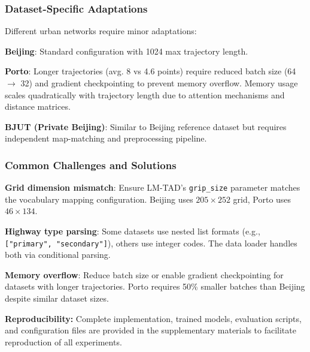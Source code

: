 \subsubsection{Dataset-Specific Adaptations}

Different urban networks require minor adaptations:

\textbf{Beijing}: Standard configuration with 1024 max trajectory length.

\textbf{Porto}: Longer trajectories (avg. 8 vs 4.6 points) require reduced batch size (64 $\rightarrow$ 32) and gradient checkpointing to prevent memory overflow. Memory usage scales quadratically with trajectory length due to attention mechanisms and distance matrices.

\textbf{BJUT (Private Beijing)}: Similar to Beijing reference dataset but requires independent map-matching and preprocessing pipeline.

\subsubsection{Common Challenges and Solutions}

\textbf{Grid dimension mismatch}: Ensure LM-TAD's \texttt{grip\_size} parameter matches the vocabulary mapping configuration. Beijing uses $205 \times 252$ grid, Porto uses $46 \times 134$.

\textbf{Highway type parsing}: Some datasets use nested list formats (e.g., \texttt{["primary", "secondary"]}), others use integer codes. The data loader handles both via conditional parsing.

\textbf{Memory overflow}: Reduce batch size or enable gradient checkpointing for datasets with longer trajectories. Porto requires 50\% smaller batches than Beijing despite similar dataset sizes.

\textbf{Reproducibility:} Complete implementation, trained models, evaluation scripts, and configuration files are provided in the supplementary materials to facilitate reproduction of all experiments.

